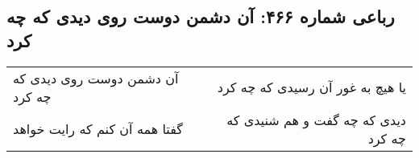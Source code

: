 \begin{center}
\section*{رباعی شماره ۴۶۶: آن دشمن دوست روی دیدی که چه کرد}
\label{sec:0466}
\begin{longtable}{l p{0.5cm} r}
آن دشمن دوست روی دیدی که چه کرد
&&
یا هیچ به غور آن رسیدی که چه کرد
\\
گفتا همه آن کنم که رایت خواهد
&&
دیدی که چه گفت و هم شنیدی که چه کرد
\\
\end{longtable}
\end{center}
